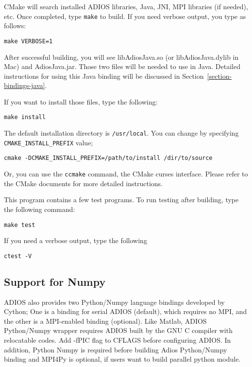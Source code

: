 CMake will search installed ADIOS libraries, Java, JNI, MPI libraries (if
needed), etc. Once completed, type \verb+make+ to build. If you need verbose output, you type as follows:
\begin{lstlisting}
make VERBOSE=1
\end{lstlisting}

After successful building, you will see libAdiosJava.so (or
libAdiosJava.dylib in Mac) and AdiosJava.jar. Those two files will be needed to use in Java. Detailed instructions for using this Java binding will be discussed in Section~\ref{section-bindings-java}.

If you want to install those files, type the following:
\begin{lstlisting}
make install
\end{lstlisting}

The default installation directory is \verb+/usr/local+. You can change by
specifying \verb+CMAKE_INSTALL_PREFIX+ value;
\begin{lstlisting}
cmake -DCMAKE_INSTALL_PREFIX=/path/to/install /dir/to/source
\end{lstlisting}

Or, you can use the \verb+ccmake+ command, the CMake curses interface. Please refer to the CMake documents for more detailed instructions.

This program contains a few test programs. To run testing after building,
type the following command:
\begin{lstlisting}
make test
\end{lstlisting}

If you need a verbose output, type the following
\begin{lstlisting}
ctest -V
\end{lstlisting}

\subsection{Support for Numpy}
\label{section-install-numpy}

ADIOS also provides two Python/Numpy language bindings developed by Cython; One is a binding for serial ADIOS (default), which requires no MPI, and the other is a MPI-enabled binding (optional). Like Matlab, ADIOS Python/Numpy wrapper requires ADIOS built by the GNU C compiler with relocatable codes. Add -fPIC flag to CFLAGS before configuring ADIOS. In addition, Python Numpy is required before building Adios Python/Numpy binding and MPI4Py is optional, if users want to build parallel python module.

